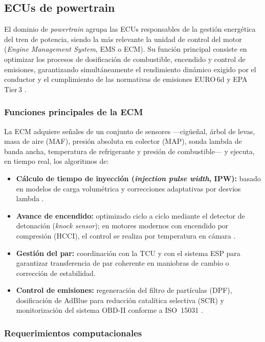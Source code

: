 \subsection{ECUs de powertrain}

El dominio de \textit{powertrain} agrupa las ECUs responsables de la gestión
energética del tren de potencia, siendo la más relevante la unidad de control
del motor (\textit{Engine Management System}, EMS o ECM). Su función principal
consiste en optimizar los procesos de dosificación de combustible, encendido y
control de emisiones, garantizando simultáneamente el rendimiento dinámico
exigido por el conductor y el cumplimiento de las normativas de emisiones
EURO\,6d y EPA Tier\,3 \citep{Reif2015}.

\subsubsection{Funciones principales de la ECM}

La ECM adquiere señales de un conjunto de sensores —cigüeñal, árbol de levas,
masa de aire (MAF), presión absoluta en colector (MAP), sonda lambda de banda
ancha, temperatura de refrigerante y presión de combustible— y ejecuta, en
tiempo real, los algoritmos de:

\begin{itemize}
	\item \textbf{Cálculo de tiempo de inyección (\textit{injection pulse width},
		IPW):} basado en modelos de carga volumétrica y correcciones adaptativas
	por desvíos lambda \citep{Bosch2014}.
	\item \textbf{Avance de encendido:} optimizado ciclo a ciclo mediante el
	detector de detonación (\textit{knock sensor}); en motores modernos
	con encendido por compresión (HCCI), el control se realiza
	por temperatura en cámara \citep{Heywood2018}.
	\item \textbf{Gestión del par:} coordinación con la TCU y con el sistema
	ESP para garantizar transferencia de par coherente en maniobras de
	cambio o corrección de estabilidad.
	\item \textbf{Control de emisiones:} regeneración del filtro de partículas
	(DPF), dosificación de AdBlue para reducción catalítica selectiva (SCR)
	y monitorización del sistema OBD-II conforme a ISO~15031 \citep{sae_j1979_2014}.
\end{itemize}

\subsubsection{Requerimientos computacionales}

